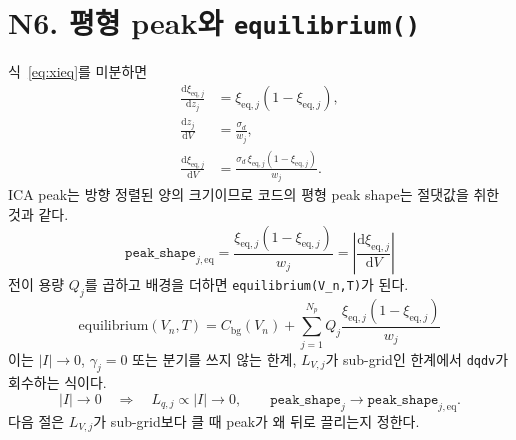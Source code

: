 \documentclass[11pt,a4paper]{article}
\newcommand{\dd}{\mathrm{d}}
\newcommand{\eq}{\mathrm{eq}}
\newcommand{\bg}{\mathrm{bg}}
\begin{document}
\section{N6. 평형 peak와 \texttt{equilibrium()}}\label{sec:N6}
식~\eqref{eq:xieq}를 미분하면
\begin{align}
\frac{\dd \xi_{\eq,j}}{\dd z_j}
&=\xi_{\eq,j}(1-\xi_{\eq,j}),\label{eq:dxidz}\\
\frac{\dd z_j}{\dd V}
&=\frac{\sigma_d}{w_j},\label{eq:dzdV}\\
\frac{\dd \xi_{\eq,j}}{\dd V}
&=\frac{\sigma_d\,\xi_{\eq,j}(1-\xi_{\eq,j})}{w_j}.
\label{eq:dxidVsig}
\end{align}
ICA peak는 방향 정렬된 양의 크기이므로 코드의 평형 peak shape는 절댓값을 취한 것과 같다.
\begin{equation}
\boxed{\;\texttt{peak\_shape}_{j,\eq}
=\frac{\xi_{\eq,j}(1-\xi_{\eq,j})}{w_j}
=\left|\frac{\dd \xi_{\eq,j}}{\dd V}\right|\;}
\label{eq:eqpeakshape}
\end{equation}
전이 용량 $Q_j$를 곱하고 배경을 더하면 \texttt{equilibrium(V\_n,T)}가 된다.
\begin{equation}
\boxed{\;\mathrm{equilibrium}(V_n,T)
=C_{\bg}(V_n)+\sum_{j=1}^{N_p}Q_j\frac{\xi_{\eq,j}(1-\xi_{\eq,j})}{w_j}\;}
\label{eq:equilibrium}
\end{equation}
이는 $|I|\to0$, $\gamma_j=0$ 또는 분기를 쓰지 않는 한계, $L_{V,j}$가 sub-grid인 한계에서 \texttt{dqdv}가 회수하는 식이다.
\begin{equation}
|I|\to0\quad\Longrightarrow\quad
L_{q,j}\propto |I|\to0,\qquad
\texttt{peak\_shape}_j\to\texttt{peak\_shape}_{j,\eq}.
\label{eq:equilimit}
\end{equation}
다음 절은 $L_{V,j}$가 sub-grid보다 클 때 peak가 왜 뒤로 끌리는지 정한다.

\end{document}
